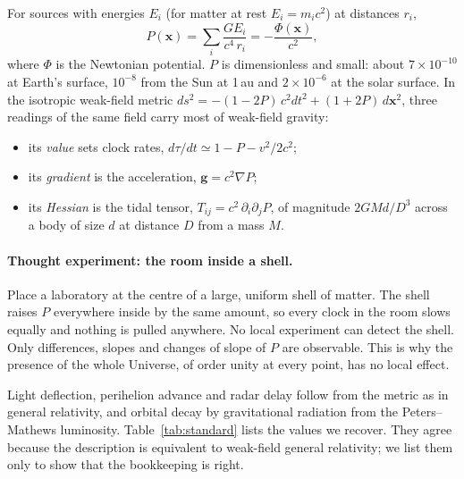 \documentclass[11pt]{article}
\begin{document}
For sources with energies $E_i$ (for matter at rest $E_i=m_ic^2$) at distances $r_i$,
\begin{equation}
P(\mathbf{x})=\sum_i\frac{G E_i}{c^4\,r_i}=-\frac{\Phi(\mathbf{x})}{c^2},
\label{eq:presence}
\end{equation}
where $\Phi$ is the Newtonian potential. $P$ is dimensionless and small: about $7\times10^{-10}$ at Earth's surface, $10^{-8}$ from the Sun at 1\,au and $2\times10^{-6}$ at the solar surface. In the isotropic weak-field metric $ds^2=-(1-2P)\,c^2dt^2+(1+2P)\,d\mathbf{x}^2$, three readings of the same field carry most of weak-field gravity:
\begin{itemize}
\item its \emph{value} sets clock rates, $d\tau/dt\simeq1-P-v^2/2c^2$;
\item its \emph{gradient} is the acceleration, $\mathbf{g}=c^2\nabla P$;
\item its \emph{Hessian} is the tidal tensor, $T_{ij}=c^2\,\partial_i\partial_jP$, of magnitude $2GMd/D^3$ across a body of size $d$ at distance $D$ from a mass $M$.
\end{itemize}

\paragraph{Thought experiment: the room inside a shell.} Place a laboratory at the centre of a large, uniform shell of matter. The shell raises $P$ everywhere inside by the same amount, so every clock in the room slows equally and nothing is pulled anywhere. No local experiment can detect the shell. Only differences, slopes and changes of slope of $P$ are observable. This is why the presence of the whole Universe, of order unity at every point, has no local effect.

Light deflection, perihelion advance and radar delay follow from the metric as in general relativity, and orbital decay by gravitational radiation from the Peters--Mathews luminosity. Table~\ref{tab:standard} lists the values we recover. They agree because the description is equivalent to weak-field general relativity; we list them only to show that the bookkeeping is right.
\end{document}

